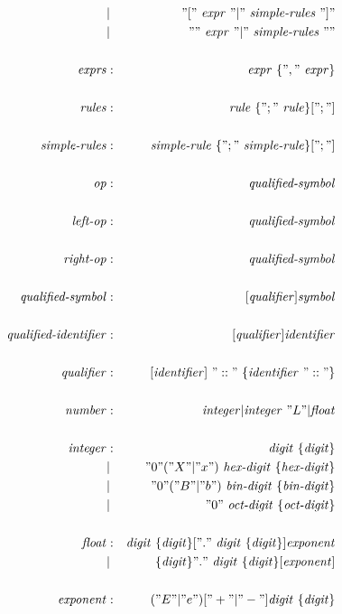 \documentclass[a4paper,12pt]{article}
\newcommand{\nt}[1]{\textrm{\textit{#1\/}}}
\begin{document}
\begin{bnf}
\begin{eqnarray*}
		&|& "["\ \nt{expr}\ "|"\ \nt{simple-rules}\ "]" \\
		&|& "{"\ \nt{expr}\ "|"\ \nt{simple-rules}\ "}" \\
\\
\nt{exprs}	&:& \nt{expr}\ \{ ","\ \nt{expr} \} \\
\\
\nt{rules}	&:& \nt{rule}\ \{ ";"\ \nt{rule} \} [ ";" ] \\
\\
\nt{simple-rules}&:& \nt{simple-rule}\ \{ ";"\ \nt{simple-rule} \} [ ";" ] \\
\\
\nt{op}		&:& \nt{qualified-symbol} \\
\\
\nt{left-op}	&:& \nt{qualified-symbol} \\
\\
\nt{right-op}	&:& \nt{qualified-symbol} \\
\\
\nt{qualified-symbol}	&:& [ \nt{qualifier} ] \nt{symbol} \\
\\
\nt{qualified-identifier}	&:& [ \nt{qualifier} ] \nt{identifier} \\
\\
\nt{qualifier}	&:& [ \nt{identifier} ]\ "::"\ \{ \nt{identifier}\ "::" \} \\
\\
\nt{number}	&:& \nt{integer} | \nt{integer}\ "L" | \nt{float} \\
\\
\nt{integer}	&:& \nt{digit}\ \{ \nt{digit} \} \\
		&|& "0"("X"|"x")\ \nt{hex-digit}\ \{ \nt{hex-digit} \} \\
		&|& "0"("B"|"b")\ \nt{bin-digit}\ \{ \nt{bin-digit} \} \\
		&|& "0"\ \nt{oct-digit}\ \{ \nt{oct-digit} \} \\
\\
\nt{float}	&:& \nt{digit}\ \{ \nt{digit} \} [ "."\ \nt{digit}\ \{ \nt{digit} \} ] \nt{exponent} \\
		&|& \hspace{-0.3em}\{ \nt{digit} \} "."\ \nt{digit}\ \{ \nt{digit} \} [ \nt{exponent} ] \\
\\
\nt{exponent}&:& \hspace{-0.3em}("E"|"e") ["+"|"-"] \nt{digit}\ \{ \nt{digit} \} \\
\\

\end{eqnarray*}
\end{bnf}
\end{document}
